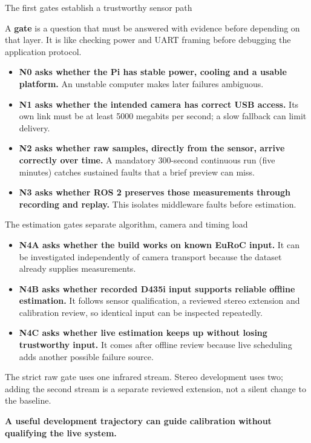 \documentclass[aspectratio=169,12pt,t]{beamer}
\newcommand{\para}[1]{#1\par\medskip}
\newcommand{\lesson}[1]{\vfill{\color{teal!70!black}\bfseries #1}\par}
\begin{document}
\begin{frame}{The first gates establish a trustworthy sensor path}

\para{A \textbf{gate} is a question that must be answered with evidence before depending on that layer. It is like checking power and UART framing before debugging the application protocol.}
\begin{itemize}
\item \textbf{N0 asks whether the Pi has stable power, cooling and a usable platform.} An unstable computer makes later failures ambiguous.
\item \textbf{N1 asks whether the intended camera has correct USB access.} Its own link must be at least 5000 megabits per second; a slow fallback can limit delivery.
\item \textbf{N2 asks whether raw samples, directly from the sensor, arrive correctly over time.} A mandatory 300-second continuous run (five minutes) catches sustained faults that a brief preview can miss.
\item \textbf{N3 asks whether ROS 2 preserves those measurements through recording and replay.} This isolates middleware faults before estimation.
\end{itemize}

\end{frame}

\begin{frame}{The estimation gates separate algorithm, camera and timing load}

\begin{itemize}
\item \textbf{N4A asks whether the build works on known EuRoC input.} It can be investigated independently of camera transport because the dataset already supplies measurements.
\item \textbf{N4B asks whether recorded D435i input supports reliable offline estimation.} It follows sensor qualification, a reviewed stereo extension and calibration review, so identical input can be inspected repeatedly.
\item \textbf{N4C asks whether live estimation keeps up without losing trustworthy input.} It comes after offline review because live scheduling adds another possible failure source.
\end{itemize}
\para{The strict raw gate uses one infrared stream. Stereo development uses two; adding the second stream is a separate reviewed extension, not a silent change to the baseline.}
\lesson{A useful development trajectory can guide calibration without qualifying the live system.}

\end{frame}
\end{document}
